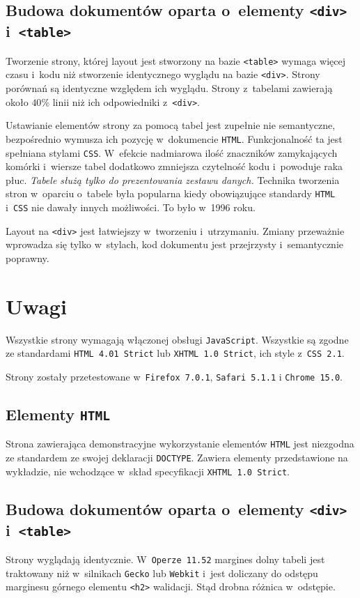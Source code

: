 \documentclass[10pt,a4paper]{article}
\newcommand{\f}[1]{\texttt{#1}}
\begin{document}
\subsection{Budowa dokumentów oparta o~elementy \f{<div>} i~\f{<table>}}
Tworzenie strony, której layout jest stworzony na bazie \f{<table>} wymaga
więcej czasu i~kodu niż stworzenie identycznego wyglądu na bazie \f{<div>}.
Strony porównań są identyczne względem ich wyglądu. Strony z~tabelami zawierają
około $40\%$ linii niż ich odpowiedniki z~\f{<div>}.

Ustawianie elementów strony za pomocą tabel jest zupełnie nie semantyczne,
bezpośrednio wymusza ich pozycję w~dokumencie \f{HTML}. Funkcjonalność ta jest
spełniana stylami \f{CSS}. W~efekcie nadmiarowa ilość znaczników zamykających
komórki i~wiersze tabel dodatkowo zmniejsza czytelność kodu i~powoduje raka
płuc. \emph{Tabele służą tylko do prezentowania zestawu danych.} Technika
tworzenia stron w~oparciu o~tabele była popularna kiedy obowiązujące standardy
\f{HTML} i~\f{CSS} nie dawały innych możliwości. To było w~1996 roku.

Layout na \f{<div>} jest łatwiejszy w~tworzeniu i~utrzymaniu. Zmiany przeważnie
wprowadza się tylko w~stylach, kod dokumentu jest przejrzysty i~semantycznie
poprawny.



\section{Uwagi}

Wszystkie strony wymagają włączonej obsługi \f{JavaScript}. Wszystkie są zgodne
ze standardami \f{HTML~4.01~Strict} lub \f{XHTML~1.0~Strict}, ich style
z~\f{CSS~2.1}.

Strony zostały przetestowane w~\f{Firefox 7.0.1}, \f{Safari 5.1.1} i \f{Chrome
15.0}.

\subsection{Elementy \f{HTML}}
Strona zawierająca demonstracyjne wykorzystanie elementów \f{HTML} jest
niezgodna ze standardem ze swojej deklaracji \f{DOCTYPE}. Zawiera elementy
przedstawione na wykładzie, nie wchodzące w~skład specyfikacji \f{XHTML 1.0
Strict}.

\subsection{Budowa dokumentów oparta o~elementy \f{<div>} i~\f{<table>}}
\label{sec:uwagi_budowa}
Strony wyglądają identycznie. W~\f{Operze 11.52} margines dolny tabeli jest
traktowany niż w~silnikach \f{Gecko} lub \f{Webkit} i~jest doliczany do odstępu
marginesu górnego elementu \f{<h2>} walidacji. Stąd drobna różnica w~odstępie.
\end{document}
